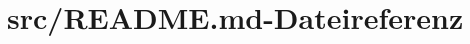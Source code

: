 \hypertarget{_r_e_a_d_m_e_8md}{\section{src/\-R\-E\-A\-D\-M\-E.md-\/\-Dateireferenz}
\label{_r_e_a_d_m_e_8md}
}
